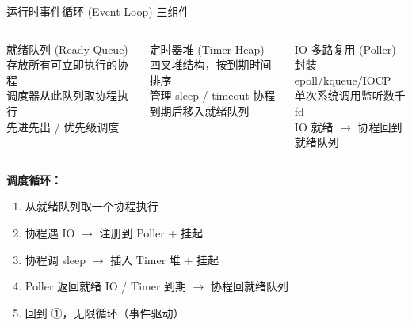 \begin{frame}{运行时事件循环 (Event Loop) 三组件}
  \begin{columns}[T]
    \begin{block}{就绪队列 (Ready Queue)}
      \centering
      \vspace{0.3em}
      存放所有可立即执行的协程\\
      调度器从此队列取协程执行\\
      先进先出 / 优先级调度
    \end{block}

    \begin{block}{定时器堆 (Timer Heap)}
      \centering
      \vspace{0.3em}
      四叉堆结构，按到期时间排序\\
      管理 sleep / timeout 协程\\
      到期后移入就绪队列
    \end{block}

    \begin{exampleblock}{IO 多路复用 (Poller)}
      \centering
      \vspace{0.3em}
      封装 epoll/kqueue/IOCP\\
      单次系统调用监听数千 fd\\
      IO 就绪 $\rightarrow$ 协程回到就绪队列
    \end{exampleblock}
  \end{columns}

  \vspace{0.6em}

  \textbf{调度循环：}
  \begin{enumerate}
    \item 从就绪队列取一个协程执行
    \item 协程遇 IO $\rightarrow$ 注册到 Poller + 挂起
    \item 协程调 sleep $\rightarrow$ 插入 Timer 堆 + 挂起
    \item Poller 返回就绪 IO / Timer 到期 $\rightarrow$ 协程回就绪队列
    \item 回到 ①，无限循环（事件驱动）
  \end{enumerate}
\end{frame}

